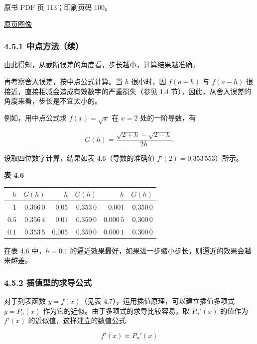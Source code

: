 \clearpage

原书 PDF 页 113；印刷页码 100。

\href{source-images/pdf-113.jpeg}{原页图像}

\subsubsection{4.5.1 中点方法（续）}\label{ch04b-ux4e2dux70b9ux65b9ux6cd5ux7eed}

由此得知，从截断误差的角度看，步长越小，计算结果越准确。

再考察舍入误差，按中点公式计算。当 \(h\) 很小时，因 \(f(a+h)\) 与 \(f(a-h)\) 很接近，直接相减会造成有效数字的严重损失（参见 1.4 节）。因此，从舍入误差的角度来看，步长是不宜太小的。

例如，用中点公式求 \(f(x)=\sqrt{x}\) 在 \(x=2\) 处的一阶导数，有

\[
G(h)=\frac{\sqrt{2+h}-\sqrt{2-h}}{2h}.
\]

设取四位数字计算，结果如表 4.6（导数的准确值 \(f'(2)=0.353\,553\)）所示。

\textbf{表 4.6}

{\def\LTcaptype{none} %
\begin{longtable}[]{@{}rrrrrr@{}}
\toprule\noalign{}
\(h\) & \(G(h)\) & \(h\) & \(G(h)\) & \(h\) & \(G(h)\) \\
\midrule\noalign{}
\endhead
\bottomrule\noalign{}
\endlastfoot
\(1\) & \(0.366\,0\) & \(0.05\) & \(0.353\,0\) & \(0.001\) & \(0.350\,0\) \\
\(0.5\) & \(0.356\,4\) & \(0.01\) & \(0.350\,0\) & \(0.000\,5\) & \(0.300\,0\) \\
\(0.1\) & \(0.353\,5\) & \(0.005\) & \(0.350\,0\) & \(0.000\,1\) & \(0.300\,0\) \\
\end{longtable}
}

在表 4.6 中，\(h=0.1\) 的逼近效果最好，如果进一步缩小步长，则逼近的效果会越来越差。

\subsubsection{4.5.2 插值型的求导公式}\label{ch04b-ux63d2ux503cux578bux7684ux6c42ux5bfcux516cux5f0f}

对于列表函数 \(y=f(x)\)（见表 4.7），运用插值原理，可以建立插值多项式 \(y=P_n(x)\) 作为它的近似。由于多项式的求导比较容易，取 \(P_n'(x)\) 的值作为 \(f'(x)\) 的近似值，这样建立的数值公式

\[
f'(x)\approx P_n'(x)
\tag{4.5.1}
\]

